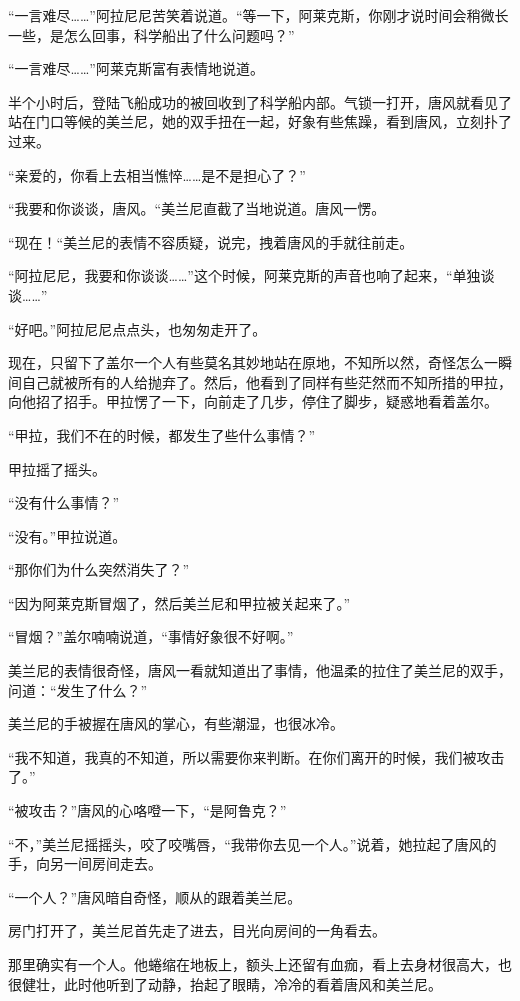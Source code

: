 “一言难尽……”阿拉尼尼苦笑着说道。“等一下，阿莱克斯，你刚才说时间会稍微长一些，是怎么回事，科学船出了什么问题吗？” 

“一言难尽……”阿莱克斯富有表情地说道。 

半个小时后，登陆飞船成功的被回收到了科学船内部。气锁一打开，唐风就看见了站在门口等候的美兰尼，她的双手扭在一起，好象有些焦躁，看到唐风，立刻扑了过来。 

“亲爱的，你看上去相当憔悴……是不是担心了？” 

“我要和你谈谈，唐风。“美兰尼直截了当地说道。唐风一愣。 

“现在！“美兰尼的表情不容质疑，说完，拽着唐风的手就往前走。 

“阿拉尼尼，我要和你谈谈……”这个时候，阿莱克斯的声音也响了起来，“单独谈谈……” 

“好吧。”阿拉尼尼点点头，也匆匆走开了。 

现在，只留下了盖尔一个人有些莫名其妙地站在原地，不知所以然，奇怪怎么一瞬间自己就被所有的人给抛弃了。然后，他看到了同样有些茫然而不知所措的甲拉，向他招了招手。甲拉愣了一下，向前走了几步，停住了脚步，疑惑地看着盖尔。 

“甲拉，我们不在的时候，都发生了些什么事情？” 

甲拉摇了摇头。 

“没有什么事情？” 

“没有。”甲拉说道。 

“那你们为什么突然消失了？” 

“因为阿莱克斯冒烟了，然后美兰尼和甲拉被关起来了。” 

“冒烟？”盖尔喃喃说道，“事情好象很不好啊。” 

美兰尼的表情很奇怪，唐风一看就知道出了事情，他温柔的拉住了美兰尼的双手，问道：“发生了什么？” 

美兰尼的手被握在唐风的掌心，有些潮湿，也很冰冷。 

“我不知道，我真的不知道，所以需要你来判断。在你们离开的时候，我们被攻击了。” 

“被攻击？”唐风的心咯噔一下，“是阿鲁克？” 

“不，”美兰尼摇摇头，咬了咬嘴唇，“我带你去见一个人。”说着，她拉起了唐风的手，向另一间房间走去。 

“一个人？”唐风暗自奇怪，顺从的跟着美兰尼。 

房门打开了，美兰尼首先走了进去，目光向房间的一角看去。 

那里确实有一个人。他蜷缩在地板上，额头上还留有血痂，看上去身材很高大，也很健壮，此时他听到了动静，抬起了眼睛，冷冷的看着唐风和美兰尼。 

